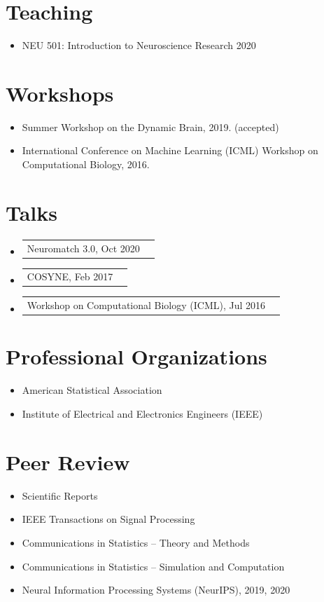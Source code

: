 \documentclass[12pt, letterpaper]{article}
\makeatletter
\newcommand{\headerrow}[2]
{\begin{tabular*}{\linewidth}{l@{\extracolsep{\fill}}r}
	#1 &
	#2 \\
\end{tabular*}}
\makeatother
\begin{document}
\nocite{*}

\section*{Teaching}
\begin{itemize}
    \item NEU 501: Introduction to Neuroscience Research 2020
\end{itemize}

\section*{Workshops}
\begin{itemize}
    \item Summer Workshop on the Dynamic Brain, 2019. (accepted)
    \item International Conference on Machine Learning (ICML) Workshop on Computational Biology, 2016.
\end{itemize}

\section*{Talks}
\begin{itemize}
    \item \headerrow{Neuromatch 3.0, Oct 2020}{}
    \item \headerrow{COSYNE, Feb 2017}{}
    \item \headerrow{Workshop on Computational Biology (ICML), Jul 2016}{}
\end{itemize}


\section*{Professional Organizations}
\begin{itemize}
    \item American Statistical Association
    \item Institute of Electrical and Electronics Engineers (IEEE)
\end{itemize}

\section*{Peer Review}
\begin{itemize}
    \item Scientific Reports
    \item IEEE Transactions on Signal Processing
    \item Communications in Statistics – Theory and Methods
    \item Communications in Statistics – Simulation and Computation
    \item Neural Information Processing Systems (NeurIPS), 2019, 2020
\end{itemize}
\end{document}
